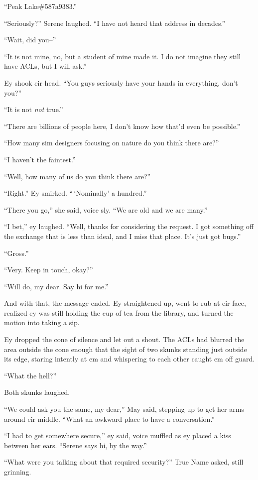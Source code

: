 ``Peak Lake\#587a9383.''

``Seriously?'' Serene laughed. ``I have not heard that address in decades.''

``Wait, did you--''

``It is not mine, no, but a student of mine made it. I do not imagine they still have ACLs, but I will ask.''

Ey shook eir head. ``You guys seriously have your hands in everything, don't you?''

``It is not \emph{not} true.''

``There are billions of people here, I don't know how that'd even be possible.''

``How many sim designers focusing on nature do you think there are?''

``I haven't the faintest.''

``Well, how many of us do you think there are?''

``Right.'' Ey smirked. ``\,`Nominally' a hundred.''

``There you go,'' she said, voice sly. ``We are old and we are many.''

``I bet,'' ey laughed. ``Well, thanks for considering the request. I got something off the exchange that is less than ideal, and I miss that place. It's just got bugs.''

``Gross.''

``Very. Keep in touch, okay?''

``Will do, my dear. Say hi for me.''

And with that, the message ended. Ey straightened up, went to rub at eir face, realized ey was still holding the cup of tea from the library, and turned the motion into taking a sip.

Ey dropped the cone of silence and let out a shout. The ACLs had blurred the area outside the cone enough that the sight of two skunks standing just outside its edge, staring intently at em and whispering to each other caught em off guard.

``What the hell?''

Both skunks laughed.

``We could ask you the same, my dear,'' May said, stepping up to get her arms around eir middle. ``What an awkward place to have a conversation.''

``I had to get somewhere secure,'' ey said, voice muffled as ey placed a kiss between her ears. ``Serene says hi, by the way.''

``What were you talking about that required security?'' True Name asked, still grinning.

